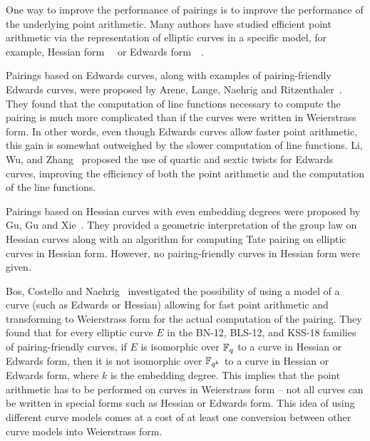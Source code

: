 One way to improve the performance of pairings is
to improve the performance of the underlying point arithmetic.
Many authors have studied efficient point arithmetic via the 
representation of elliptic curves in a specific model,
for example, Hessian form~\cite{2001/smart}~\cite{2001/joye} or
Edwards form~\cite{2007/edwards}~\cite{2007/bernstein-newelliptic}.

Pairings based on Edwards curves,
along with examples of pairing-friendly Edwards curves,
were proposed by Arene, Lange, Naehrig and Ritzenthaler~\cite{2009/fastertate}.
They found that the computation of line functions necessary to compute the pairing
is much more complicated than if the curves were written in Weierstrass form.
In other words,
even though Edwards curves allow faster point arithmetic,
this gain is somewhat outweighed by the slower computation of line functions.
Li, Wu, and Zhang~\cite{2014/LWZ} proposed the use of quartic and sextic twists
for Edwards curves, improving the efficiency of both the point arithmetic and
the computation of the line functions.

Pairings based on Hessian curves with even embedding degrees were proposed by Gu, Gu and Xie~\cite{2010/Gu}.
They provided a geometric interpretation of the group law on Hessian curves
along with an algorithm for computing Tate pairing on elliptic curves in Hessian form.
However, no pairing-friendly curves in Hessian form were given.

Bos, Costello and Naehrig~\cite{2013/bos-pairing} investigated the possibility of
using a model of a curve (such as Edwards or Hessian) allowing for fast point arithmetic
and transforming to Weierstrass form for the actual computation of the pairing.
They found that for every elliptic curve $E$ in the BN-12, BLS-12, and KSS-18 families of pairing-friendly curves,
if $E$ is isomorphic over $\mathbb{F}_{q}$ to a curve in Hessian or Edwards form,
then it is not isomorphic over $\mathbb{F}_{q^{k}}$ to a curve in Hessian or Edwards form,
where $k$ is the embedding degree.
This implies that the point arithmetic has to be performed on curves in Weierstrass form -- not all curves can be written in special forms such as Hessian or Edwards form.
This idea of using different curve models comes at a cost of at least one conversion
between other curve models into Weierstrass form.


